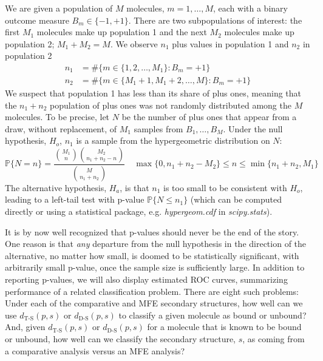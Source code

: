 \documentclass[10pt,letterpaper]{article}
\begin{document}
We are given a population of $M$ molecules, $m=1,\ldots,M$, each with a binary outcome measure $B_m\in\{-1,+1\}$.
There are two subpopulations of interest: the first $M_1$ molecules make up population 1 and the next $M_2$ molecules make up population 2; $M_1+M_2=M$. We observe $n_1$ plus values in population 1 and $n_2$ in population 2 
\begin{align}
n_1 & = \#\big\{m\in\{1,2,\ldots,M_1\}:B_m=+1\big\} \\
n_2 & = \#\big\{m\in\{M_1+1,M_1+2,\ldots,M\}:B_m=+1\big\}
\end{align}
We suspect that population 1 has less than its share of plus ones, meaning that the $n_1+n_2$ population of plus ones was not randomly distributed among the $M$ molecules. To be precise, let $N$ be the number of plus ones that appear from a draw, without replacement, of $M_1$ samples from $B_1,\ldots,B_M$. Under the null hypothesis, $H_o$, $n_1$ is a sample from the hypergeometric distribution on $N$:
\begin{equation}
\label{eqn:null}
\mathbb{P}\{N=n\} = \frac{\binom{M_1}{n}\binom{M_2}{n_1+n_2-n}}
{\binom{M}{n_1+n_2}}\quad \max\{0,n_1+n_2-M_2\}\leq n 
\leq \min\{n_1+n_2,M_1\}
\end{equation}
The alternative hypothesis, $H_a$, is that $n_1$ is too small to be consistent with $H_o$, leading to a left-tail test with p-value $\mathbb{P}\{N\leq n_1\}$ (which can be computed directly or using a statistical package, e.g. {\em hypergeom.cdf} in {\em scipy.stats}).

It is by now well recognized that p-values should never be the end of the story. One reason is that {\em any} departure from the null hypothesis in the direction of the alternative, no matter how small, is doomed to be statistically significant, with arbitrarily small p-value, once the sample size is sufficiently large. In addition to reporting p-values, we will also display estimated ROC curves, summarizing performance of a related classification problem.  There are eight such problems: Under each of the comparative and MFE secondary structures, how well can we use $d_\text{T-S}(p,s)$ or $d_\text{D-S}(p,s)$ to classify a given molecule as bound or unbound? And, given 
$d_\text{T-S}(p,s)$ or $d_\text{D-S}(p,s)$ for a molecule that is known to be bound or unbound, how well can we classify the secondary structure, $s$, as coming from a comparative analysis versus an MFE analysis?
\end{document}
